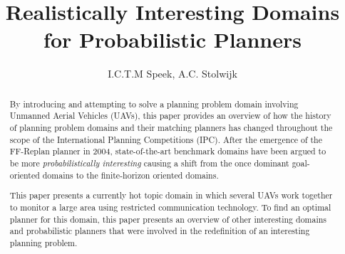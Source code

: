 \documentclass[runningheads,a4paper]{llncs}
\begin{document}
\mainmatter%

\title{Realistically Interesting Domains for Probabilistic Planners}


\author{I.C.T.M Speek, A.C. Stolwijk}

%



\maketitle



\begin{abstract}
By introducing and attempting to solve a planning problem domain involving Unmanned Aerial Vehicles (UAVs), this paper provides an overview of how the history of planning problem domains and their matching planners has changed throughout the scope of the International Planning Competitions (IPC). After the emergence of the FF-Replan planner in 2004, state-of-the-art benchmark domains have been argued to be more \emph{probabilistically interesting} causing a shift from the once dominant goal-oriented domains to the finite-horizon oriented domains. 

This paper presents a currently hot topic domain in which several UAVs  work together to monitor a large area using restricted communication technology. To find an optimal planner for this domain, this paper presents an overview of other interesting domains and probabilistic planners that were involved in the redefinition of an interesting planning problem. 

\end{abstract}
\end{document}
